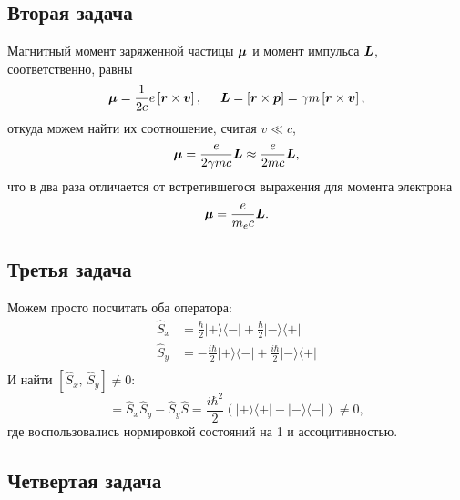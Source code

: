 \subsection*{Вторая задача}

Магнитный момент заряженной частицы $\mbox{\boldmath $\mu$}$ и момент импульса $\mbox{\boldmath $L$}$, соответственно, равны
\begin{equation*}
    \mbox{\boldmath $\mu$} = \frac{1}{2c} e \left[\mbox{\boldmath $r$} \times  \mbox{\boldmath $v$}\right],
    \hspace{5 mm} 
    \mbox{\boldmath $L$} = \left[\mbox{\boldmath $r$} \times  \mbox{\boldmath $p$}\right] = \gamma m\left[
        \mbox{\boldmath $r$}\times \mbox{\boldmath $v$}
    \right],
\end{equation*}
откуда можем найти их соотношение, считая $v \ll c$, 
\begin{equation*}
    \mbox{\boldmath $\mu$} = \frac{e}{2\gamma m c} \mbox{\boldmath $L$} \approx 
    \frac{e}{2mc} \mbox{\boldmath $L$},
\end{equation*}
что в два раза отличается от встретившегося выражения для момента электрона
\begin{equation*}
    \mbox{\boldmath $\mu$} = \frac{e}{m_e c} \mbox{\boldmath $L$}.
\end{equation*}



\subsection*{Третья задача}

Можем просто посчитать оба оператора:
\begin{align*}
    \hat{S}_x &= \textstyle \frac{\hbar}{2} | + \rangle \langle - | + 
    \textstyle \frac{\hbar}{2} | - \rangle \langle + | \\
    \hat{S}_y &= - \textstyle \frac{i \hbar}{2} | + \rangle \langle - | + 
    \textstyle \frac{i \hbar}{2} | - \rangle \langle + | \\
\end{align*}
И найти $[\hat{S}_x,\, \hat{S}_y] \neq 0$:
\begin{equation*}
    [\hat{S}_x,\, \hat{S}_y] = \hat{S}_x \hat{S}_y - \hat{S}_y \hat{S} = 
    \frac{i \hbar^2}{2}\left(
         | + \rangle \langle + |  - | - \rangle \langle - | 
    \right) \neq 0,
\end{equation*}
где воспользовались нормировкой состояний на 1 и ассоцитивностью.


\subsection*{Четвертая задача}

